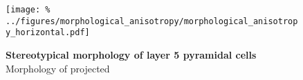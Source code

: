 \begin{figure}[h]
  \texttt{[image: \%
    ../figures/morphological\_anisotropy/morphological\_anisotropy\_horizontal.pdf]} %
\caption{\textbf{Stereotypical morphology of layer 5 pyramidal cells} Morphology of projected \cite{Romand2011} }
\label{fig:stereo_morph}
\end{figure}

